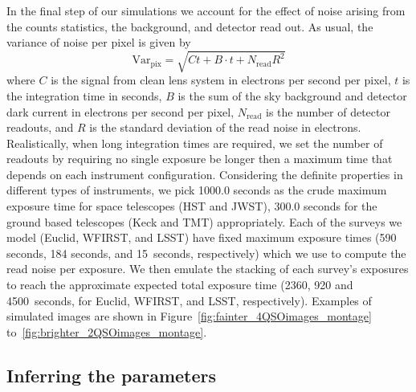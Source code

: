 \documentclass[a4paper,11pt]{article}
\begin{document}
{In the final step of our simulations we account for the effect of
noise arising from the counts statistics, the background, and detector
read out. As usual, the variance of noise per pixel is given by
%
\begin{equation}
   \label{eq:noise}
   \mathrm{Var}_{\mathrm{pix}} = \sqrt{Ct+B\cdot t + N_{\mathrm{read}} R^{2}}
\end{equation}
%
where $C$ is the signal from clean lens system in electrons per second
per pixel, $t$ is the integration time in seconds, $B$
is the sum of the sky background and detector dark current in
electrons per second per pixel, $N_{\mathrm{read}}$ is the number of
detector readouts, and $R$ is the standard deviation of the read noise
in electrons. Realistically, when long integration times are required,
we set the number of readouts by requiring no single exposure be
longer then a maximum time that depends on each instrument
configuration.
Considering the definite properties in different types of instruments,
we pick 1000.0 seconds as the crude maximum exposure time for space
telescopes (HST and JWST), 300.0 seconds for the ground based
telescopes (Keck and TMT) appropriately. Each of the surveys we
model  (Euclid, WFIRST, and LSST) have fixed maximum exposure times
(590 seconds, 184 seconds, and 15~seconds, respectively) which
we use to compute the read noise per exposure. We then emulate  the
stacking of each survey's exposures to reach the approximate expected
total exposure time (2360, 920 and 4500~seconds, for Euclid, WFIRST,
and LSST, respectively).
Examples of simulated images are shown in
Figure~\ref{fig:fainter_4QSOimages_montage}
to~\ref{fig:brighter_2QSOimages_montage}.

\subsection{Inferring the parameters}
\label{ssec:inf}

}
\end{document}
